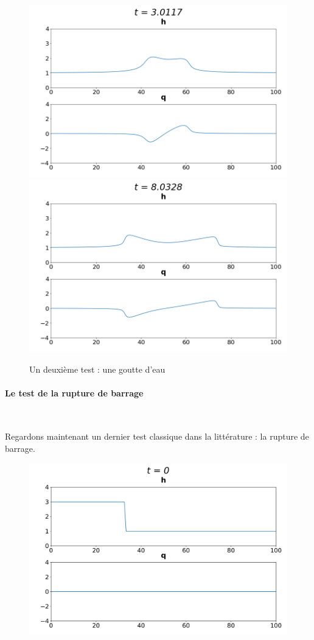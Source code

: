 \documentclass[
11pt, %
francais, %
singlespacing, %
headsepline, %
]{MastersDoctoralThesis} %
\begin{document}
\begin{figure}
\includegraphics[scale = .6]{"bosse4.png"}
\includegraphics[scale = .6]{"bosse10.png"} 
\caption{Un deuxième test : une goutte d'eau}
\end{figure}

\paragraph{Le test de la rupture de barrage} \

Regardons maintenant un dernier test classique dans la littérature : la rupture de barrage.

\begin{figure}
\centering
\includegraphics[scale = .7]{"barrage0"}
\end{figure}
\end{document}
